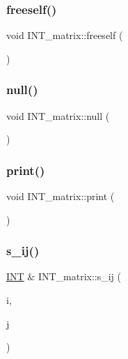 \subsubsection{\texorpdfstring{freeself()}{freeself()}}
{\footnotesize\ttfamily void I\+N\+T\+\_\+matrix\+::freeself (\begin{DoxyParamCaption}{ }\end{DoxyParamCaption})}

\mbox{\label{class_i_n_t__matrix_a516efd12df2b5b15a4af3b85d409c4bc}} 
\subsubsection{\texorpdfstring{null()}{null()}}
{\footnotesize\ttfamily void I\+N\+T\+\_\+matrix\+::null (\begin{DoxyParamCaption}{ }\end{DoxyParamCaption})}

\mbox{\label{class_i_n_t__matrix_a02695ab85f9330a2bc730796d88fb672}} 
\subsubsection{\texorpdfstring{print()}{print()}}
{\footnotesize\ttfamily void I\+N\+T\+\_\+matrix\+::print (\begin{DoxyParamCaption}{ }\end{DoxyParamCaption})}

\mbox{\label{class_i_n_t__matrix_a495bf91b533aa26fd82c276b8c38aec7}} 
\subsubsection{\texorpdfstring{s\+\_\+ij()}{s\_ij()}}
{\footnotesize\ttfamily \mbox{\hyperlink{galois_8h_a09fddde158a3a20bd2dcadb609de11dc}{I\+NT}} \& I\+N\+T\+\_\+matrix\+::s\+\_\+ij (\begin{DoxyParamCaption}\item[{\mbox{\hyperlink{galois_8h_a09fddde158a3a20bd2dcadb609de11dc}{I\+NT}}}]{i,  }\item[{\mbox{\hyperlink{galois_8h_a09fddde158a3a20bd2dcadb609de11dc}{I\+NT}}}]{j }\end{DoxyParamCaption})}

